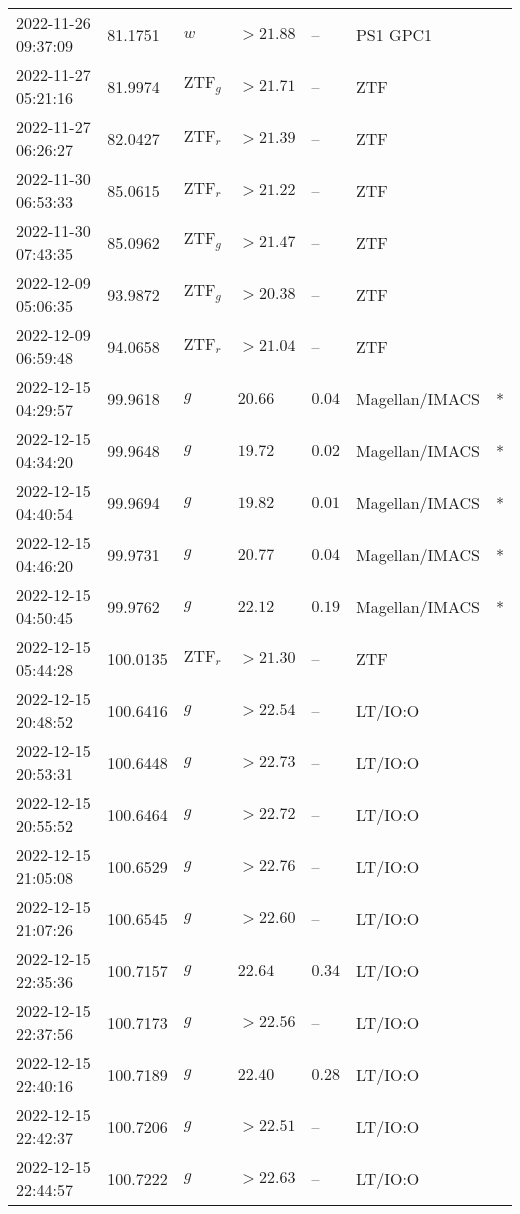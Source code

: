\documentclass{nature_plusfigure}
\begin{document}
\begin{supplement}
\begin{center}
\begin{longtable}{lllllll}
2022-11-26 09:37:09 & 81.1751 & $w$ & $>21.88$ & -- & PS1 GPC1 &  \\ 
2022-11-27 05:21:16 & 81.9974 & $\mathrm{ZTF}_{g}$ & $>21.71$ & -- & ZTF &  \\ 
2022-11-27 06:26:27 & 82.0427 & $\mathrm{ZTF}_{r}$ & $>21.39$ & -- & ZTF &  \\ 
2022-11-30 06:53:33 & 85.0615 & $\mathrm{ZTF}_{r}$ & $>21.22$ & -- & ZTF &  \\ 
2022-11-30 07:43:35 & 85.0962 & $\mathrm{ZTF}_{g}$ & $>21.47$ & -- & ZTF &  \\ 
2022-12-09 05:06:35 & 93.9872 & $\mathrm{ZTF}_{g}$ & $>20.38$ & -- & ZTF &  \\ 
2022-12-09 06:59:48 & 94.0658 & $\mathrm{ZTF}_{r}$ & $>21.04$ & -- & ZTF &  \\ 
2022-12-15 04:29:57 & 99.9618 & $g$ & $20.66$ & $0.04$ & Magellan/IMACS & * \\ 
2022-12-15 04:34:20 & 99.9648 & $g$ & $19.72$ & $0.02$ & Magellan/IMACS & * \\ 
2022-12-15 04:40:54 & 99.9694 & $g$ & $19.82$ & $0.01$ & Magellan/IMACS & * \\ 
2022-12-15 04:46:20 & 99.9731 & $g$ & $20.77$ & $0.04$ & Magellan/IMACS & * \\ 
2022-12-15 04:50:45 & 99.9762 & $g$ & $22.12$ & $0.19$ & Magellan/IMACS & * \\ 
2022-12-15 05:44:28 & 100.0135 & $\mathrm{ZTF}_{r}$ & $>21.30$ & -- & ZTF &  \\ 
2022-12-15 20:48:52 & 100.6416 & $g$ & $>22.54$ & -- & LT/IO:O &  \\ 
2022-12-15 20:53:31 & 100.6448 & $g$ & $>22.73$ & -- & LT/IO:O &  \\ 
2022-12-15 20:55:52 & 100.6464 & $g$ & $>22.72$ & -- & LT/IO:O &  \\ 
2022-12-15 21:05:08 & 100.6529 & $g$ & $>22.76$ & -- & LT/IO:O &  \\ 
2022-12-15 21:07:26 & 100.6545 & $g$ & $>22.60$ & -- & LT/IO:O &  \\ 
2022-12-15 22:35:36 & 100.7157 & $g$ & $22.64$ & $0.34$ & LT/IO:O &  \\ 
2022-12-15 22:37:56 & 100.7173 & $g$ & $>22.56$ & -- & LT/IO:O &  \\ 
2022-12-15 22:40:16 & 100.7189 & $g$ & $22.40$ & $0.28$ & LT/IO:O &  \\ 
2022-12-15 22:42:37 & 100.7206 & $g$ & $>22.51$ & -- & LT/IO:O &  \\ 
2022-12-15 22:44:57 & 100.7222 & $g$ & $>22.63$ & -- & LT/IO:O &  \\ 

\end{longtable}
\end{center}
\end{supplement}
\end{document}
